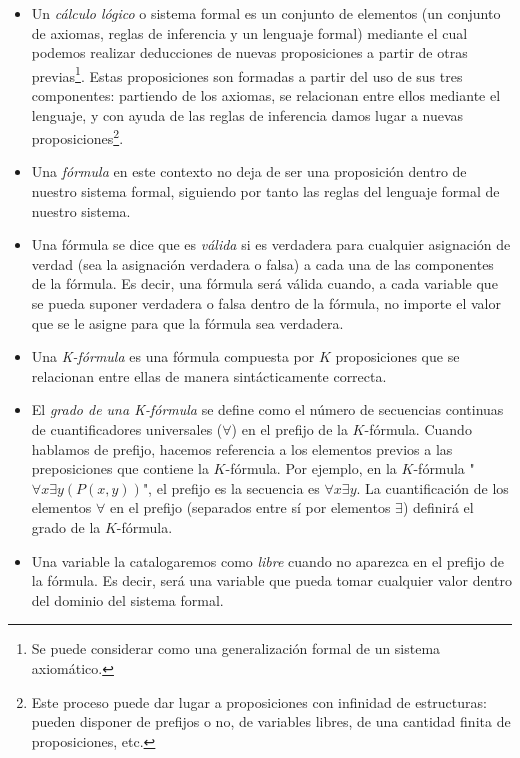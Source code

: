\begin{itemize}
    \item Un \textit{cálculo lógico} o sistema formal es un conjunto de elementos (un conjunto de axiomas, reglas de inferencia y un lenguaje formal) mediante el cual podemos 
            realizar deducciones de nuevas proposiciones a partir de otras previas\footnote{Se puede considerar como una generalización formal de un sistema axiomático.}. Estas proposiciones
            son formadas a partir del uso de sus tres componentes: partiendo de los axiomas, se relacionan entre ellos mediante el lenguaje, y con ayuda de las reglas de inferencia
            damos lugar a nuevas proposiciones\footnote{Este proceso puede dar lugar a proposiciones con infinidad de estructuras: pueden disponer de prefijos o no, de variables libres, 
            de una cantidad finita de proposiciones, etc.}.
    \item Una \textit{fórmula} en este contexto no deja de ser una proposición dentro de nuestro sistema formal, siguiendo por tanto las reglas del lenguaje formal de nuestro sistema.
    \item Una fórmula se dice que es \textit{válida} si es verdadera para cualquier asignación de verdad (sea la asignación verdadera o falsa) a cada
            una de las componentes de la fórmula. Es decir, una fórmula será válida cuando, a cada variable que se pueda suponer verdadera o falsa dentro de la fórmula, no importe el valor que se 
            le asigne para que la fórmula sea verdadera.
    \item Una \textit{K-fórmula} es una fórmula compuesta por $K$ proposiciones que se relacionan entre ellas de manera sintácticamente correcta.
    \item El \textit{grado de una K-fórmula} se define como el número de secuencias continuas de cuantificadores universales ($\forall$) en el prefijo de la $K$-fórmula. 
            Cuando hablamos de prefijo, hacemos referencia a los elementos previos a las preposiciones que contiene la $K$-fórmula. Por ejemplo, en la $K$-fórmula "$\forall x \exists y (P(x, y))$", el prefijo es la secuencia
            es $\forall x \exists y$. La cuantificación de los elementos $\forall$  en el prefijo (separados entre sí por elementos $\exists$) definirá el grado de la $K$-fórmula.
    \item Una variable la catalogaremos como \textit{libre} cuando no aparezca en el prefijo de la fórmula. Es decir, será una variable que pueda tomar cualquier valor dentro del dominio
            del sistema formal.

\end{itemize}
